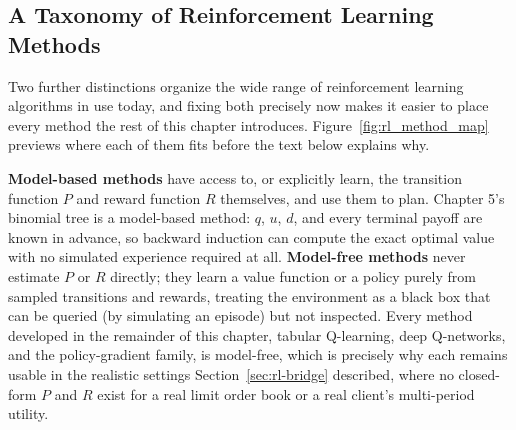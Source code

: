 \documentclass[../ai_in_finance]{subfiles}
\begin{document}
\subsection{A Taxonomy of Reinforcement Learning Methods}
\label{sec:rl-taxonomy}

Two further distinctions organize the wide range of reinforcement learning algorithms in use today, and fixing both precisely now makes it easier to place every method the rest of this chapter introduces. Figure~\ref{fig:rl_method_map} previews where each of them fits before the text below explains why.

\begin{figure}[htbp]
\centering
\begin{lrbox}{\bookmeasuredbox}
\end{lrbox}
\ifdim\wd\bookmeasuredbox<0.65\linewidth
\setlength{\bookcapwidth}{0.65\linewidth}
\else
\setlength{\bookcapwidth}{\wd\bookmeasuredbox}
\fi
{}
\end{figure}

\textbf{Model-based methods} have access to, or explicitly learn, the transition function $P$ and reward function $R$ themselves, and use them to plan. Chapter 5's binomial tree is a model-based method: $q$, $u$, $d$, and every terminal payoff are known in advance, so backward induction can compute the exact optimal value with no simulated experience required at all. \textbf{Model-free methods} never estimate $P$ or $R$ directly; they learn a value function or a policy purely from sampled transitions and rewards, treating the environment as a black box that can be queried (by simulating an episode) but not inspected. Every method developed in the remainder of this chapter, tabular Q-learning, deep Q-networks, and the policy-gradient family, is model-free, which is precisely why each remains usable in the realistic settings Section~\ref{sec:rl-bridge} described, where no closed-form $P$ and $R$ exist for a real limit order book or a real client's multi-period utility.
\end{document}
